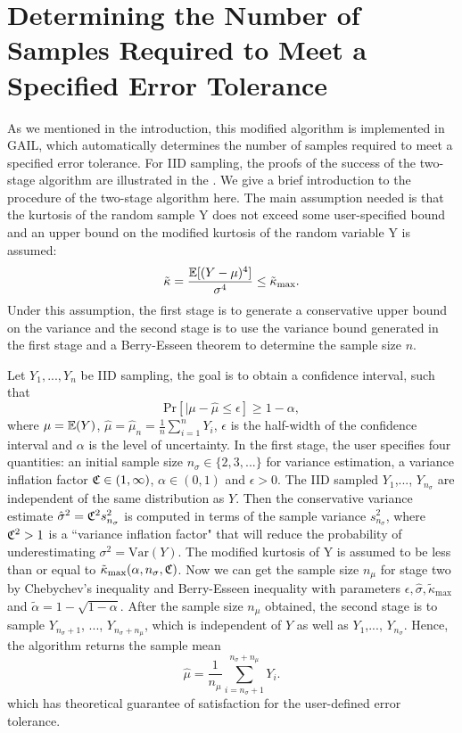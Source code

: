 \documentclass{ws-ijfe}
\begin{document}
\section{Determining the Number of Samples Required to Meet a Specified Error Tolerance}
As we mentioned in the introduction, this modified algorithm is implemented in GAIL, which automatically determines the number of samples required to meet a specified error tolerance. For IID sampling, the proofs of the success of the two-stage algorithm are illustrated in the \cite{HickernellandLan2013}. We give a brief introduction to the procedure of the two-stage algorithm here. The main assumption needed is that the kurtosis of the random sample Y does not exceed some user-specified bound and an upper bound on the modified kurtosis of the random variable Y is assumed:
\begin{equation*}
  \tilde{\kappa}=\frac{\mathbb{E}[(Y-\mu)^4]}{\sigma^4}\leq\tilde{\kappa}_{\text{max}}.
\end{equation*}
Under this assumption, the first stage is to generate a conservative upper bound on the variance and the second stage is to use the variance bound generated in the first stage and a Berry-Esseen theorem to determine the sample size $n$.

Let $Y_1,...,Y_n$ be IID sampling, the goal is to obtain a confidence interval, such that
\begin{equation*}
  \text{Pr}[|\mu-\hat{\mu}\leq\epsilon]\geq1-\alpha,
\end{equation*}
where $\mu=\mathbb{E}(Y)$, $\hat{\mu}=\hat{\mu}_n=\frac{1}{n}\sum\limits_{i=1}^{n}Y_i$, $\epsilon$ is the half-width of the confidence interval and $\alpha$ is the level of uncertainty.
In the first stage, the user specifies four quantities: an initial sample size $n_{\sigma}\in\{2,3,...\}$ for variance estimation, a variance inflation factor $\frak{C}\in(1,\infty)$, $\alpha\in(0,1)$ and $\epsilon>0$. The IID sampled $Y_1$,..., $Y_{n_\sigma}$ are independent of the same distribution as $Y$. Then the conservative variance estimate $\hat{\sigma}^2 = \frak{C}^2s_{n_{\sigma}}^2$ is computed in terms of the sample variance $s_{n_{\sigma}}^2$, where $\frak{C}^2>1$ is a ``variance inflation factor" that will reduce the probability of underestimating $\sigma^2=\text{Var}(Y)$. The modified kurtosis of Y is assumed to be less than or equal to $\tilde{\kappa}_{\text{max}}(\alpha,n_{\sigma},\frak{C})$. Now we can get the sample size $n_{\mu}$ for stage two by Chebychev's inequality and Berry-Esseen inequality with parameters $\epsilon, \hat{\sigma}, \tilde{\kappa}_{\text{max}}$ and $\tilde{\alpha}=1-\sqrt{1-\alpha}$. After the sample size $n_{\mu}$ obtained, the second stage is to sample $Y_{n_\sigma+1}$, ..., $Y_{n_\sigma+n_\mu}$, which is independent of $Y$ as well as $Y_1$,..., $Y_{n_\sigma}$. Hence, the algorithm returns the sample mean
\begin{equation*}
  \hat{\mu}=\frac{1}{n_{\mu}}\sum\limits_{i=n_{\sigma}+1}^{n_{\sigma}+n_{\mu}}Y_i.
\end{equation*}
which has theoretical guarantee of satisfaction for the user-defined error tolerance.
\end{document}
